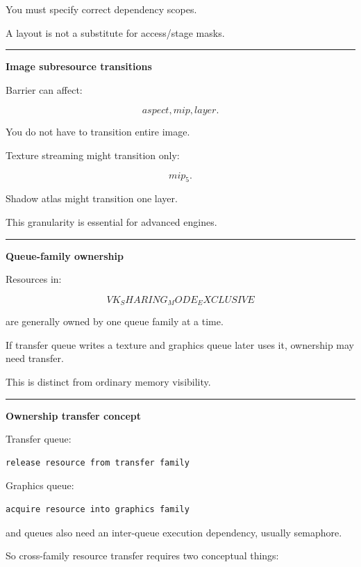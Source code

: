 You must specify correct dependency scopes.

A layout is not a substitute for access/stage masks.

\begin{center}\rule{0.5\linewidth}{0.5pt}\end{center}

\textbf{Image subresource transitions}

Barrier can affect:

\[
aspect,
mip,
layer.
\]

You do not have to transition entire image.

Texture streaming might transition only:

\[
mip_5.
\]

Shadow atlas might transition one layer.

This granularity is essential for advanced engines.

\begin{center}\rule{0.5\linewidth}{0.5pt}\end{center}

\textbf{Queue-family ownership}

Resources in:

\[
VK_SHARING_MODE_EXCLUSIVE
\]

are generally owned by one queue family at a time.

If transfer queue writes a texture and graphics queue later uses it, ownership may need transfer.

This is distinct from ordinary memory visibility.

\begin{center}\rule{0.5\linewidth}{0.5pt}\end{center}

\textbf{Ownership transfer concept}

Transfer queue:

\begin{verbatim}
release resource from transfer family
\end{verbatim}

Graphics queue:

\begin{verbatim}
acquire resource into graphics family
\end{verbatim}

and queues also need an inter-queue execution dependency, usually semaphore.

So cross-family resource transfer requires two conceptual things:

